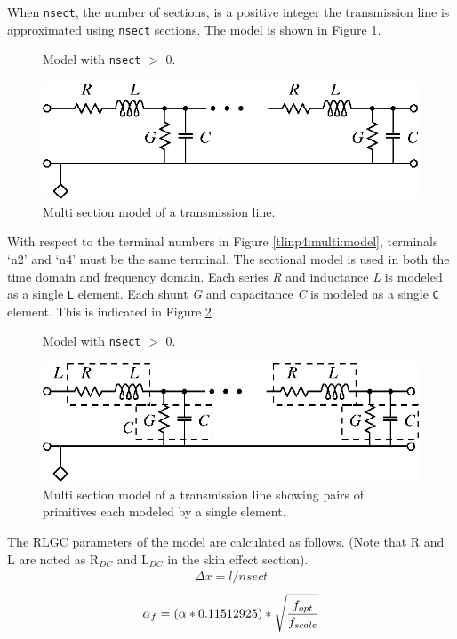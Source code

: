 \documentclass{article}
\begin{document}
{When  \texttt{nsect}, the number of sections, is a positive integer the transmission line is approximated using \texttt{nsect} sections. The model is shown in Figure \ref{tlinp4:section:model}.
\begin{figure}[h]
\centerline{Model with \texttt{nsect} $>$ 0.}
\centerline{\includegraphics[scale=1.0]{tlinp4_sections.eps}} \caption{Multi section model of a transmission line.\label{tlinp4:section:model}}
\end{figure}
With respect to the terminal numbers in Figure \ref{tlinp4:multi:model}, terminals `n2' and `n4' must be the same terminal.
The sectional model is used in both the time domain and frequency domain.  Each series \emph{R} and inductance \emph{L} is modeled as a single \texttt{L} element. Each shunt \emph{G} and capacitance \emph{C} is modeled as a single \texttt{C} element. This is indicated in   Figure \ref{tlinp4:sectionb:model}
\begin{figure}[h]
\centerline{Model with \texttt{nsect} $>$ 0.}
\centerline{\includegraphics[scale=1.0]{tlinp4_sectionsb.eps}} \caption{Multi section model of a transmission line showing pairs of primitives each modeled by a single element.\label{tlinp4:sectionb:model}}
\end{figure}
The RLGC parameters of the model are calculated as follows.  (Note that R and L are noted as R$_{DC}$ and L$_{DC}$ in the skin effect section).
\begin{eqnarray}
\label{deltax} 
\Delta x = l/nsect
\end{eqnarray}
%
\begin{eqnarray}
\label{alpha} 
\alpha _f  = \left( {\alpha *0.11512925} \right)*\sqrt {{{f_{opt} } \over {f_{scale} }}} 

\end{eqnarray}}
\end{document}
